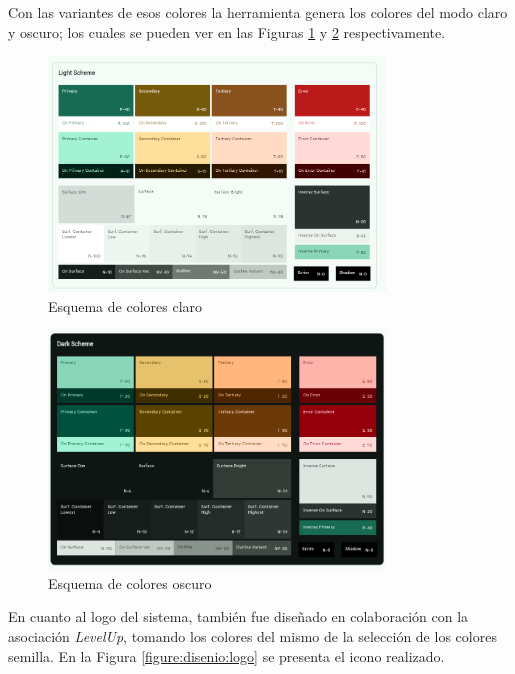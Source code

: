             Con las variantes de esos colores la herramienta genera los colores del modo claro y oscuro; los cuales se pueden ver en las Figuras \ref{figure:disenio:esquema_claro} y \ref{figure:disenio:esquema_oscuro} respectivamente.

            \begin{figure}[h]
                \centering
                \includegraphics[width=0.8\textwidth]{figures/diseno/colores/Esquema de colores claro.png}
                \caption{Esquema de colores claro}
                \label{figure:disenio:esquema_claro}
            \end{figure}
    
            \begin{figure}[h]
                \centering
                \includegraphics[width=0.8\textwidth]{figures/diseno/colores/Esquema de colores oscuro.png}
                \caption{Esquema de colores oscuro}
                \label{figure:disenio:esquema_oscuro}
            \end{figure}

            En cuanto al logo del sistema, también fue diseñado en colaboración con la asociación \textit{LevelUp}, tomando los colores del mismo de la selección de los colores semilla. En la Figura \ref{figure:disenio:logo} se presenta el icono realizado.

